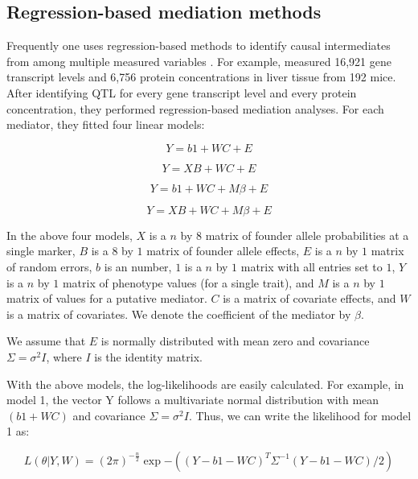 \documentclass{article}
\begin{document}
\subsection{Regression-based mediation methods}

Frequently one uses regression-based methods to identify causal intermediates from among multiple measured variables \citep{baron1986moderator}. For example, \citet{chick2016defining} measured 16,921 gene transcript levels and 6,756 protein concentrations in liver tissue from 192 mice. After identifying QTL for every gene transcript level and every protein concentration, they performed regression-based mediation analyses. For each mediator, they fitted four linear models: 

\begin{equation}
Y = b1 + WC + E
\label{model1}
\end{equation}

\begin{equation}
Y = XB + WC + E
\label{model2}
\end{equation}

\begin{equation}
Y = b1 + WC + M\beta + E
\label{model3}
\end{equation}

\begin{equation}
Y = XB + WC + M\beta + E
\label{model4}
\end{equation}

In the above four models, $X$ is a $n$ by $8$ matrix of founder allele probabilities at a single marker, $B$ is a $8$ by $1$ matrix of founder allele effects, $E$ is a $n$ by $1$ matrix of random errors, $b$ is an number, $1$ is a $n$ by $1$ matrix with all entries set to $1$, $Y$ is a $n$ by $1$ matrix of phenotype values (for a single trait), and $M$ is a $n$ by $1$ matrix of values for a putative mediator. $C$ is a matrix of covariate effects, and $W$ is a matrix of covariates. We denote the coefficient of the mediator by $\beta$.

We assume that $E$ is normally distributed with mean zero and covariance $\Sigma = \sigma^2I$, where $I$ is the identity matrix.

With the above models, the log-likelihoods are easily calculated. For example, in model 1, the vector Y follows a multivariate normal distribution with mean $(b1 + WC)$ and covariance $\Sigma = \sigma^2I$. Thus, we can write the likelihood for model 1 as:

\begin{equation}
    L(\theta | Y, W) = (2\pi)^{- \frac{n}{2}}\exp{ - \left((Y - b1 - WC)^T\Sigma^{-1}(Y - b1 - WC) / 2\right)}
\end{equation}
\end{document}
